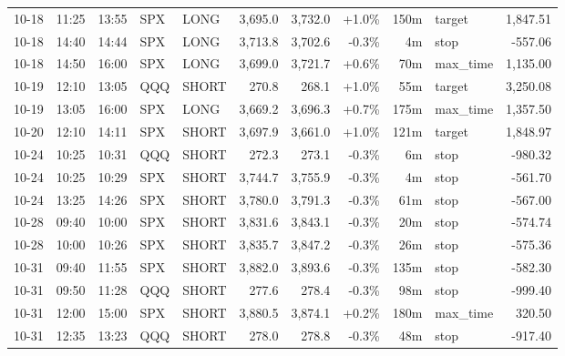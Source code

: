 \documentclass[11pt,a4paper,twoside]{article}
\begin{document}
\begin{center}
\begin{longtable}{>{\color{txtmain}}l l l l l r r r r >{\color{txtmain}}l r}
10-18 & 11:25 & 13:55 & SPX & LONG & 3,695.0 & 3,732.0 & \textcolor{wingreen}{+1.0\%} & 150m & target & \textcolor{wingreen}{1,847.51} \\
10-18 & 14:40 & 14:44 & SPX & LONG & 3,713.8 & 3,702.6 & \textcolor{lossred}{-0.3\%} & 4m & stop & \textcolor{lossred}{-557.06} \\
10-18 & 14:50 & 16:00 & SPX & LONG & 3,699.0 & 3,721.7 & \textcolor{wingreen}{+0.6\%} & 70m & max\_time & \textcolor{wingreen}{1,135.00} \\
10-19 & 12:10 & 13:05 & QQQ & SHORT & 270.8 & 268.1 & \textcolor{wingreen}{+1.0\%} & 55m & target & \textcolor{wingreen}{3,250.08} \\
10-19 & 13:05 & 16:00 & SPX & LONG & 3,669.2 & 3,696.3 & \textcolor{wingreen}{+0.7\%} & 175m & max\_time & \textcolor{wingreen}{1,357.50} \\
10-20 & 12:10 & 14:11 & SPX & SHORT & 3,697.9 & 3,661.0 & \textcolor{wingreen}{+1.0\%} & 121m & target & \textcolor{wingreen}{1,848.97} \\
10-24 & 10:25 & 10:31 & QQQ & SHORT & 272.3 & 273.1 & \textcolor{lossred}{-0.3\%} & 6m & stop & \textcolor{lossred}{-980.32} \\
10-24 & 10:25 & 10:29 & SPX & SHORT & 3,744.7 & 3,755.9 & \textcolor{lossred}{-0.3\%} & 4m & stop & \textcolor{lossred}{-561.70} \\
10-24 & 13:25 & 14:26 & SPX & SHORT & 3,780.0 & 3,791.3 & \textcolor{lossred}{-0.3\%} & 61m & stop & \textcolor{lossred}{-567.00} \\
10-28 & 09:40 & 10:00 & SPX & SHORT & 3,831.6 & 3,843.1 & \textcolor{lossred}{-0.3\%} & 20m & stop & \textcolor{lossred}{-574.74} \\
10-28 & 10:00 & 10:26 & SPX & SHORT & 3,835.7 & 3,847.2 & \textcolor{lossred}{-0.3\%} & 26m & stop & \textcolor{lossred}{-575.36} \\
10-31 & 09:40 & 11:55 & SPX & SHORT & 3,882.0 & 3,893.6 & \textcolor{lossred}{-0.3\%} & 135m & stop & \textcolor{lossred}{-582.30} \\
10-31 & 09:50 & 11:28 & QQQ & SHORT & 277.6 & 278.4 & \textcolor{lossred}{-0.3\%} & 98m & stop & \textcolor{lossred}{-999.40} \\
10-31 & 12:00 & 15:00 & SPX & SHORT & 3,880.5 & 3,874.1 & \textcolor{wingreen}{+0.2\%} & 180m & max\_time & \textcolor{wingreen}{320.50} \\
10-31 & 12:35 & 13:23 & QQQ & SHORT & 278.0 & 278.8 & \textcolor{lossred}{-0.3\%} & 48m & stop & \textcolor{lossred}{-917.40} \\

\end{longtable}
\end{center}
\end{document}
